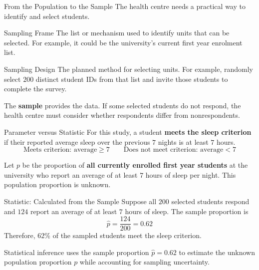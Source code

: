 \documentclass[aspectratio=169]{beamer}
\begin{document}
\begin{frame}{From the Population to the Sample}
The health centre needs a practical way to identify and select students.

\begin{block}{Sampling Frame}
The list or mechanism used to identify units that can be selected. For example, it could be the university's current first year enrolment list.
\end{block}

\begin{block}{Sampling Design}
The planned method for selecting units. For example, randomly select $200$ distinct student IDs from that list and invite those students to complete the survey.
\end{block}

The \textbf{sample} provides the data. If some selected students do not respond, the health centre must consider whether respondents differ from nonrespondents.
\end{frame}

\begin{frame}{Parameter versus Statistic}
For this study, a student \textbf{meets the sleep criterion} if their reported average sleep over the previous $7$ nights is at least $7$ hours.
$$\text{Meets criterion: average}\geq7\qquad\text{Does not meet criterion: average}<7$$

Let $p$ be the proportion of \textbf{all currently enrolled first year students} at the university who report an average of at least $7$ hours of sleep per night. This population proportion is unknown.

\begin{block}{Statistic: Calculated from the Sample}
Suppose all $200$ selected students respond and $124$ report an average of at least $7$ hours of sleep. The sample proportion is
$$\hat{p}=\frac{124}{200}=0.62$$
Therefore, $62\%$ of the sampled students meet the sleep criterion.
\end{block}
Statistical inference uses the sample proportion $\hat{p}=0.62$ to estimate the unknown population proportion $p$ while accounting for sampling uncertainty.
\end{frame}
\end{document}
